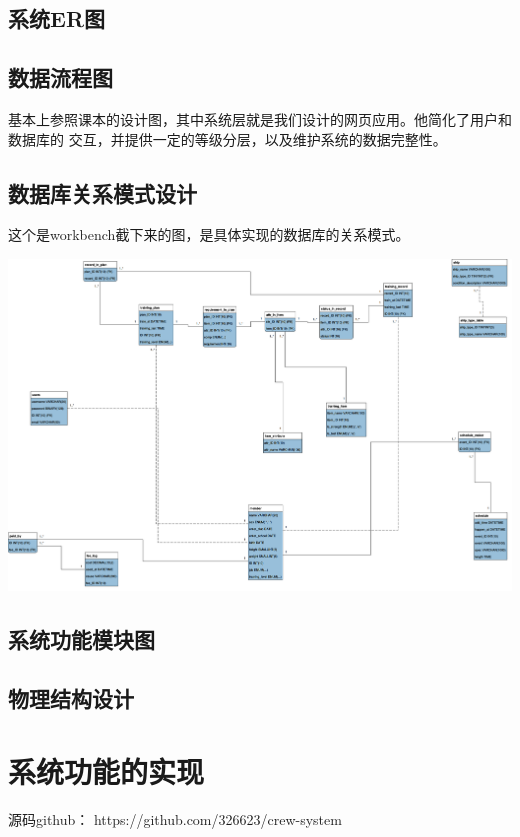 \subsection{系统ER图}



\subsection{数据流程图}
基本上参照课本的设计图，其中系统层就是我们设计的网页应用。他简化了用户和数据库的
交互，并提供一定的等级分层，以及维护系统的数据完整性。



\subsection{数据库关系模式设计}
这个是workbench截下来的图，是具体实现的数据库的关系模式。

\includegraphics[width=\textwidth]{figure/relation-schema}

\subsection{系统功能模块图}


\subsection{物理结构设计}


\section{系统功能的实现}
源码github： https://github.com/326623/crew-system\\

